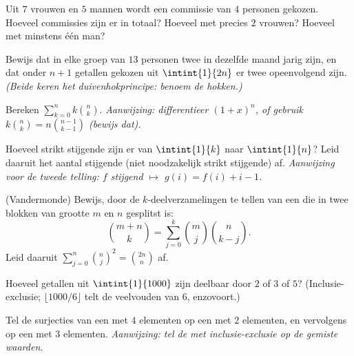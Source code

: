 \begin{exercise}[$\star$]\label{exo:b1:counting:3}
Uit $7$ vrouwen en $5$ mannen wordt een commissie van $4$ personen
gekozen. Hoeveel commissies zijn er in totaal? Hoeveel met precies $2$
vrouwen? Hoeveel met minstens één man?
\end{exercise}

\begin{exercise}[$\star$]\label{exo:b1:counting:4}
Bewijs dat in elke groep van $13$ personen twee in dezelfde maand jarig
zijn, en dat onder $n + 1$ getallen gekozen uit $\intint{1}{2n}$ er twee
opeenvolgend zijn. \emph{(Beide keren het duivenhokprincipe: benoem de
hokken.)}
\end{exercise}

\begin{exercise}[$\star$]\label{exo:b1:counting:5}
Bereken $\sum_{k=0}^{n} k \binom{n}{k}$. \emph{Aanwijzing: differentieer
$(1 + x)^n$, of gebruik $k \binom nk = n \binom{n-1}{k-1}$ (bewijs dat).}
\end{exercise}

\begin{exercise}[$\star\star$]\label{exo:b1:counting:6}
Hoeveel strikt stijgende  zijn er van $\intint{1}{k}$ naar
$\intint{1}{n}$? Leid daaruit het aantal stijgende (niet noodzakelijk
strikt stijgende)  af. \emph{Aanwijzing voor de tweede
telling: $f$ stijgend $\mapsto$ $g(i) = f(i) + i - 1$.}
\end{exercise}

\begin{exercise}[$\star\star$]\label{exo:b1:counting:7}
(Vandermonde) Bewijs, door de $k$-deelverzamelingen te tellen van een
 die in twee blokken van grootte $m$ en $n$ gesplitst is:
\[
\binom{m+n}{k} = \sum_{j=0}^{k} \binom{m}{j} \binom{n}{k-j} .
\]
Leid daaruit $\sum_{j=0}^{n} \binom nj^2 = \binom{2n}{n}$ af.
\end{exercise}

\begin{exercise}[$\star\star$]\label{exo:b1:counting:8}
Hoeveel getallen uit $\intint{1}{1000}$ zijn deelbaar door $2$ of $3$ of
$5$? (Inclusie-exclusie; $\lfloor 1000/6 \rfloor$ telt de veelvouden van
$6$, enzovoort.)
\end{exercise}

\begin{exercise}[$\star\star$]\label{exo:b1:counting:9}
Tel de surjecties van een  met $4$ elementen op een
 met $2$ elementen, en vervolgens op een  met $3$
elementen. \emph{Aanwijzing: tel de   met
inclusie-exclusie op de gemiste waarden.}
\end{exercise}

